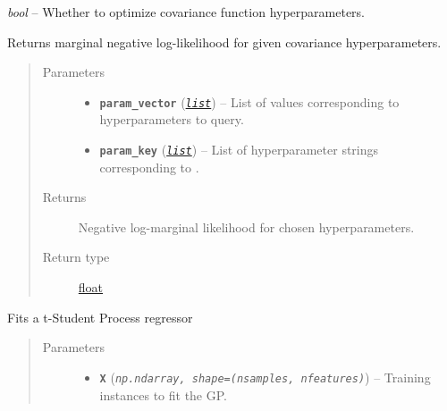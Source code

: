 \documentclass[letterpaper,10pt,english]{sphinxmanual}
\begin{document}
\begin{fulllineitems}
\begin{fulllineitems}
\label{pyGPGO.surrogates.tStudentProcess:pyGPGO.surrogates.tStudentProcess.tStudentProcess.optimize}
\emph{bool} -- Whether to optimize covariance function hyperparameters.

\end{fulllineitems}


\begin{fulllineitems}
\label{pyGPGO.surrogates.tStudentProcess:pyGPGO.surrogates.tStudentProcess.tStudentProcess._lmlik}
Returns marginal negative log-likelihood for given covariance hyperparameters.
\begin{quote}\begin{description}
\item[{Parameters}] \leavevmode\begin{itemize}
\item {} 
\textbf{\texttt{param\_vector}} (\href{https://docs.python.org/2/library/functions.html\#list}{\emph{\texttt{list}}}) -- List of values corresponding to hyperparameters to query.

\item {} 
\textbf{\texttt{param\_key}} (\href{https://docs.python.org/2/library/functions.html\#list}{\emph{\texttt{list}}}) -- List of hyperparameter strings corresponding to .

\end{itemize}

\item[{Returns}] \leavevmode
Negative log-marginal likelihood for chosen hyperparameters.

\item[{Return type}] \leavevmode
\href{https://docs.python.org/2/library/functions.html\#float}{float}

\end{description}\end{quote}

\end{fulllineitems}


\begin{fulllineitems}
\label{pyGPGO.surrogates.tStudentProcess:pyGPGO.surrogates.tStudentProcess.tStudentProcess.fit}
Fits a t-Student Process regressor
\begin{quote}\begin{description}
\item[{Parameters}] \leavevmode\begin{itemize}
\item {} 
\textbf{\texttt{X}} (\emph{\texttt{np.ndarray, shape=(nsamples, nfeatures)}}) -- Training instances to fit the GP.


\end{itemize}
\end{description}
\end{quote}
\end{fulllineitems}
\end{fulllineitems}
\end{document}
